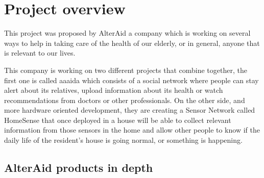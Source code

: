 \chapter{Project overview}\label{C:project-overview}
This project was proposed by AlterAid a company which is working on several ways to help in taking care of the health of our elderly, or in general, anyone that is relevant to our lives.

This company is working on two different projects that combine together, the first one is called aaaida which consists of a social network where people can stay alert about its relatives, upload information about its health or watch recommendations from doctors or other professionals. On the other side, and more hardware oriented development, they are creating a Sensor Network called HomeSense that once deployed in a house will be able to collect relevant information from those sensors in the home and allow other people to know if the daily life of the resident's house is going normal, or something is happening.

\section{AlterAid products in depth}\label{S:alteraid-products}

